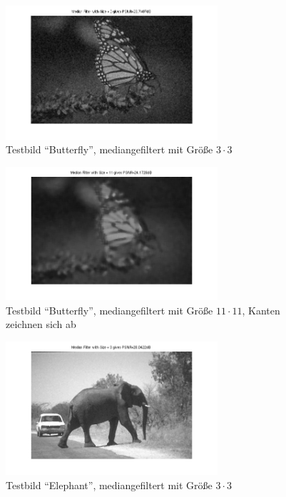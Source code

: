 \begin{figure}[htb]
 \centering
 \includegraphics[width=0.7\textwidth]{../images_out/t2_b_m3.png}
 \caption{Testbild ``Butterfly'', mediangefiltert mit Größe $3 \cdot 3$}
 \label{fig:t2_b_m3}
\end{figure}

\begin{figure}[htb]
 \centering
 \includegraphics[width=0.7\textwidth]{../images_out/t2_b_m11_.png}
 \caption{Testbild ``Butterfly'', mediangefiltert mit Größe $11 \cdot 11$, Kanten zeichnen sich ab}
 \label{fig:t2_b_m11_}
\end{figure}

\begin{figure}[htb]
 \centering
 \includegraphics[width=0.7\textwidth]{../images_out/t2_e_m3.png}
 \caption{Testbild ``Elephant'', mediangefiltert mit Größe $3 \cdot 3$}
 \label{fig:t2_e_m3}
\end{figure}

